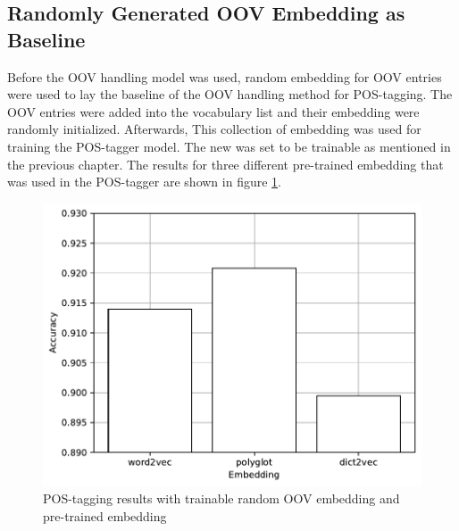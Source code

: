       \subsection{Randomly Generated OOV Embedding as Baseline}
      Before the OOV handling model was used, random embedding for OOV
      entries were used to lay the baseline of the OOV handling method
      for POS-tagging. The OOV entries were added into the vocabulary
      list and their embedding were randomly initialized. Afterwards,
      This collection of embedding was used for training the
      POS-tagger model. The new was set to be trainable as mentioned
      in the previous chapter. The results for three different
      pre-trained embedding that was used in the POS-tagger are shown
      in figure \ref{fig:postag_random_results}.
      \begin{figure}[H]
        \centering
        \includegraphics[width=0.8\linewidth]{images/random_graph.pdf}
        \caption{POS-tagging results with trainable random OOV embedding and pre-trained embedding}
        \label{fig:postag_random_results}
      \end{figure}

